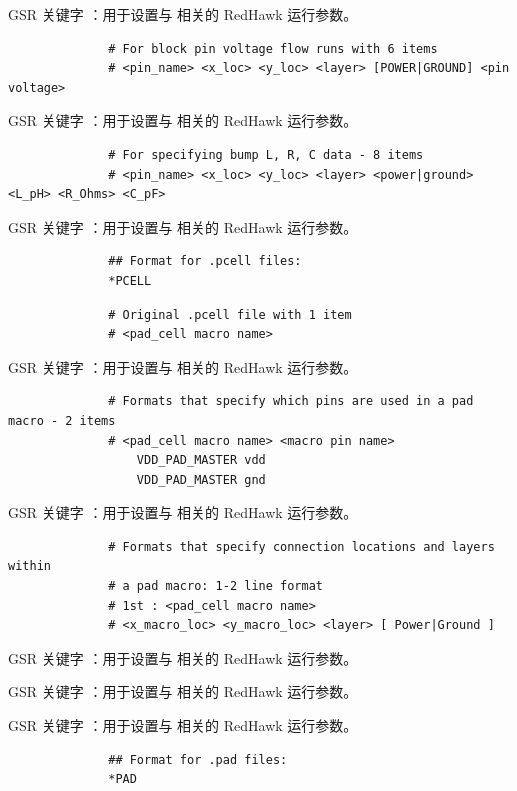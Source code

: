 GSR 关键字 ：用于设置与  相关的 RedHawk 运行参数。

\begin{lstlisting}
              # For block pin voltage flow runs with 6 items
              # <pin_name> <x_loc> <y_loc> <layer> [POWER|GROUND] <pin voltage>
\end{lstlisting}

GSR 关键字 ：用于设置与  相关的 RedHawk 运行参数。

\begin{lstlisting}
              # For specifying bump L, R, C data - 8 items
              # <pin_name> <x_loc> <y_loc> <layer> <power|ground> <L_pH> <R_Ohms> <C_pF>
\end{lstlisting}

GSR 关键字 ：用于设置与  相关的 RedHawk 运行参数。

\begin{lstlisting}
              ## Format for .pcell files:
              *PCELL
\end{lstlisting}

\begin{lstlisting}
              # Original .pcell file with 1 item
              # <pad_cell macro name>
\end{lstlisting}

GSR 关键字 ：用于设置与  相关的 RedHawk 运行参数。

\begin{lstlisting}
              # Formats that specify which pins are used in a pad macro - 2 items
              # <pad_cell macro name> <macro pin name>
                  VDD_PAD_MASTER vdd
                  VDD_PAD_MASTER gnd
\end{lstlisting}

GSR 关键字 ：用于设置与  相关的 RedHawk 运行参数。

\begin{lstlisting}
              # Formats that specify connection locations and layers within
              # a pad macro: 1-2 line format
              # 1st : <pad_cell macro name>
              # <x_macro_loc> <y_macro_loc> <layer> [ Power|Ground ]
\end{lstlisting}

GSR 关键字 ：用于设置与  相关的 RedHawk 运行参数。

GSR 关键字 ：用于设置与  相关的 RedHawk 运行参数。

GSR 关键字 ：用于设置与  相关的 RedHawk 运行参数。

\begin{lstlisting}
              ## Format for .pad files:
              *PAD
\end{lstlisting}

